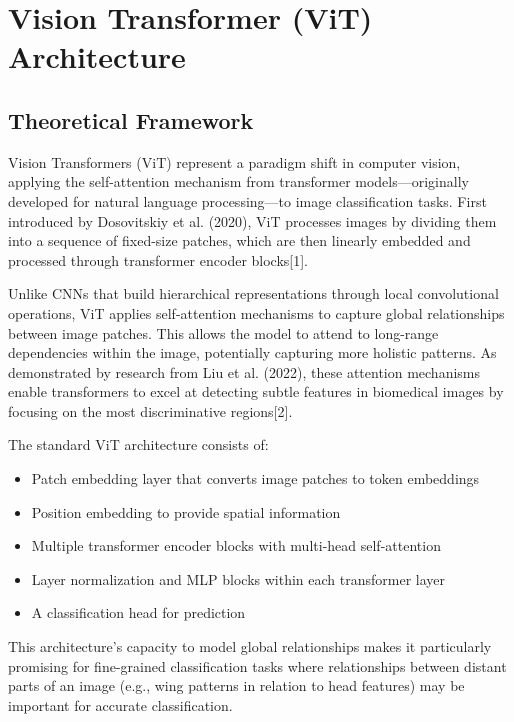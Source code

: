 


\section{Vision Transformer (ViT) Architecture}

\subsection{Theoretical Framework}

Vision Transformers (ViT) represent a paradigm shift in computer vision, applying the self-attention mechanism from transformer models—originally developed for natural language processing—to image classification tasks. First introduced by Dosovitskiy et al. (2020), ViT processes images by dividing them into a sequence of fixed-size patches, which are then linearly embedded and processed through transformer encoder blocks[1].

Unlike CNNs that build hierarchical representations through local convolutional operations, ViT applies self-attention mechanisms to capture global relationships between image patches. This allows the model to attend to long-range dependencies within the image, potentially capturing more holistic patterns. As demonstrated by research from Liu et al. (2022), these attention mechanisms enable transformers to excel at detecting subtle features in biomedical images by focusing on the most discriminative regions[2].

The standard ViT architecture consists of:

\begin{itemize}
    \item Patch embedding layer that converts image patches to token embeddings
    \item Position embedding to provide spatial information
    \item Multiple transformer encoder blocks with multi-head self-attention
    \item Layer normalization and MLP blocks within each transformer layer
    \item A classification head for prediction
\end{itemize}

This architecture's capacity to model global relationships makes it particularly promising for fine-grained classification tasks where relationships between distant parts of an image (e.g., wing patterns in relation to head features) may be important for accurate classification.

